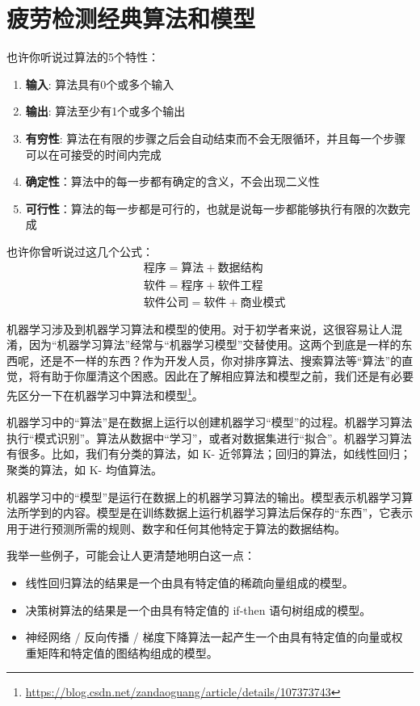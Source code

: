 
\chapter{疲劳检测经典算法和模型}

也许你听说过算法的5个特性：
\begin{enumerate}
    \item \textbf{输入}: 算法具有0个或多个输入
    \item \textbf{输出}: 算法至少有1个或多个输出
    \item \textbf{有穷性}: 算法在有限的步骤之后会自动结束而不会无限循环，并且每一个步骤可以在可接受的时间内完成
    \item \textbf{确定性}：算法中的每一步都有确定的含义，不会出现二义性
    \item \textbf{可行性}：算法的每一步都是可行的，也就是说每一步都能够执行有限的次数完成
\end{enumerate}

也许你曾听说过这几个公式：
\begin{align}
& \mbox{程序} = \mbox{算法} + \mbox{数据结构} \\
& \mbox{软件} = \mbox{程序} + \mbox{软件工程} \\
& \mbox{软件公司} = \mbox{软件} + \mbox{商业模式}
\end{align}

机器学习涉及到机器学习算法和模型的使用。对于初学者来说，这很容易让人混淆，因为“机器学习算法”经常与“机器学习模型”交替使用。这两个到底是一样的东西呢，还是不一样的东西？作为开发人员，你对排序算法、搜索算法等“算法”的直觉，将有助于你厘清这个困惑。因此在了解相应算法和模型之前，我们还是有必要先区分一下在机器学习中算法和模型\footnote{\url{https://blog.csdn.net/zandaoguang/article/details/107373743}}。

机器学习中的“算法”是在数据上运行以创建机器学习“模型”的过程。机器学习算法执行“模式识别”。算法从数据中“学习”，或者对数据集进行“拟合”。机器学习算法有很多。比如，我们有分类的算法，如 K- 近邻算法；回归的算法，如线性回归；聚类的算法，如 K- 均值算法。

机器学习中的“模型”是运行在数据上的机器学习算法的输出。模型表示机器学习算法所学到的内容。模型是在训练数据上运行机器学习算法后保存的“东西”，它表示用于进行预测所需的规则、数字和任何其他特定于算法的数据结构。

我举一些例子，可能会让人更清楚地明白这一点：
\begin{itemize}
    \item 线性回归算法的结果是一个由具有特定值的稀疏向量组成的模型。
    \item 决策树算法的结果是一个由具有特定值的 if-then 语句树组成的模型。
    \item 神经网络 / 反向传播 / 梯度下降算法一起产生一个由具有特定值的向量或权重矩阵和特定值的图结构组成的模型。
\end{itemize}

